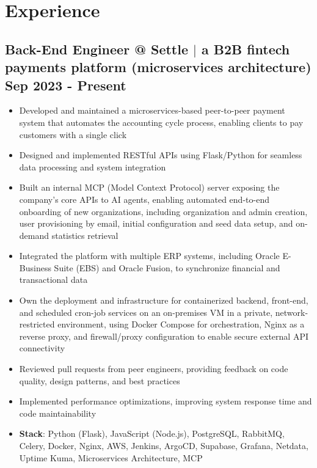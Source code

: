 \documentclass[a4paper,10pt]{article}
\newenvironment{zitemize}{
\begin{itemize}\itemsep0pt \parskip0pt \parsep1pt}
{\end{itemize}\vspace{-0.5cm}}
\begin{document}
\section{Experience}

\subsection*{Back-End Engineer @ Settle $|$ a B2B fintech payments platform (microservices architecture) \hfill Sep 2023 - Present}
    \begin{zitemize}
        \item Developed and maintained a microservices-based peer-to-peer payment system that automates the accounting cycle process, enabling clients to pay customers with a single click
        \item Designed and implemented RESTful APIs using Flask/Python for seamless data processing and system integration
        \item Built an internal MCP (Model Context Protocol) server exposing the company's core APIs to AI agents, enabling automated end-to-end onboarding of new organizations, including organization and admin creation, user provisioning by email, initial configuration and seed data setup, and on-demand statistics retrieval
        \item Integrated the platform with multiple ERP systems, including Oracle E-Business Suite (EBS) and Oracle Fusion, to synchronize financial and transactional data
        \item Own the deployment and infrastructure for containerized backend, front-end, and scheduled cron-job services on an on-premises VM in a private, network-restricted environment, using Docker Compose for orchestration, Nginx as a reverse proxy, and firewall/proxy configuration to enable secure external API connectivity
        \item Reviewed pull requests from peer engineers, providing feedback on code quality, design patterns, and best practices
        \item Implemented performance optimizations, improving system response time and code maintainability
        \item \textbf{Stack}: Python (Flask), JavaScript (Node.js), PostgreSQL, RabbitMQ, Celery, Docker, Nginx, AWS, Jenkins, ArgoCD, Supabase, Grafana, Netdata, Uptime Kuma, Microservices Architecture, MCP
    \end{zitemize}
\end{document}
